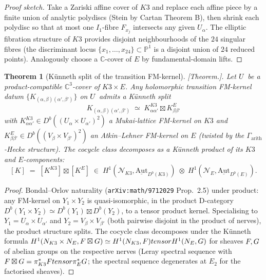 \documentclass[11pt]{amsart}
\newtheorem{theorem}{Theorem}[section]
\providecommand{\C}{\mathbb{C}}
\providecommand{\Aut}{\mathrm{Aut}}
\providecommand{\cN}{\mathcal{N}}
\providecommand{\cF}{\mathcal{F}}
\providecommand{\ClaimStatusTheorem}{[\emph{Theorem.}]}
\begin{document}
\begin{proof}[Proof sketch]
Take a Zariski affine cover of $K3$ and replace each affine piece by a
finite union of analytic polydiscs (Stein by Cartan Theorem B), then
shrink each polydisc so that at most one $I_1$-fibre $F_{x_j}$
intersects any given $U_\alpha$. The elliptic fibration structure of
$K3$ provides disjoint neighbourhoods of the $24$ singular fibres
(the discriminant locus $\{x_1, \ldots, x_{24}\} \subset \mathbb{P}^1$
is a disjoint union of $24$ reduced points). Analogously choose a
$\C$-cover of $E$ by fundamental-domain lifts.
\end{proof}

\begin{theorem}[K\"{u}nneth split of the transition FM-kernel]
\label{thm:R13-kunneth-split}
\ClaimStatusTheorem.
Let $U$ be a product-compatible $\C^3$-cover of $K3 \times E$. Any
holomorphic transition FM-kernel datum
$\{K_{(\alpha, \beta)(\alpha', \beta')}\}$ on $U$ admits a
K\"{u}nneth split
\[
  K_{(\alpha, \beta)(\alpha', \beta')} \;\simeq\;
  K^{K3}_{\alpha \alpha'} \boxtimes K^{E}_{\beta \beta'}
\]
with $K^{K3}_{\alpha \alpha'} \in D^b((U_\alpha \times U_{\alpha'})^2)$
a Mukai-lattice FM-kernel on $K3$ and $K^E_{\beta \beta'} \in D^b(
(V_\beta \times V_{\beta'})^2)$ an Atkin--Lehner FM-kernel on $E$
(twisted by the $\Gamma_{\mathrm{arith}}$-Hecke structure). The
cocycle class decomposes as a K\"{u}nneth product of its $K3$ and
$E$-components:
\[
  [K] \;=\; [K^{K3}] \boxtimes [K^E] \;\in\;
  H^1(\cN_{K3}, \underline{\Aut}_{D^b(K3)}) \;\otimes\;
  H^1(\cN_E, \underline{\Aut}_{D^b(E)}).
\]
\end{theorem}

\begin{proof}[Proof]
Bondal--Orlov naturality (\texttt{arXiv:math/9712029} Prop.~2.5) under
product: any FM-kernel on $Y_1 \times Y_2$ is quasi-isomorphic, in
the product D-category
$D^b(Y_1 \times Y_2) \simeq D^b(Y_1) \boxtimes D^b(Y_2)$, to a
tensor product kernel. Specialising to $Y_1 = U_\alpha \times U_{\alpha'}$
and $Y_2 = V_\beta \times V_{\beta'}$ (both pairwise disjoint in the
product of nerves), the product structure splits. The cocycle class
decomposes under the K\"{u}nneth formula
$H^1(\cN_{K3} \times \cN_E, \cF \boxtimes \cG) \simeq
H^1(\cN_{K3}, \cF) \otimes H^1(\cN_E, \cG)$ for sheaves
$\cF, \cG$ of abelian groups on the respective nerves
(Leray spectral sequence with
$\cF \boxtimes \cG = \pi_{K3}^* \cF \otimes \pi_E^* \cG$; the spectral
sequence degenerates at $E_2$ for the factorised sheaves).
\end{proof}
\end{document}
